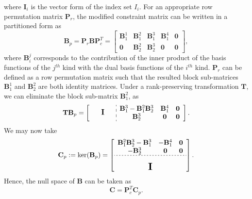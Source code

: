 \documentclass[preprint,12pt]{elsarticle}
\theoremstyle{remark}
\begin{document}
where $\mathbf{I}_i$ is the vector form of the index set  $I_i$. For an appropriate row permutation matrix $\mathbf{P}_r$, the modified constraint matrix can be written in a partitioned form as
\begin{equation}
    \mathbf{B}_p=\mathbf{P}_r\mathbf{B}\mathbf{P}_c^T=
    \begin{bmatrix}
        \mathbf{B}_1^1 & \mathbf{B}_1^2 & \mathbf{B}_1^3 & \mathbf{B}_1^4 & \mathbf{0} \\
        \mathbf{0} & \mathbf{B}_2^2 & \mathbf{B}_2^3 & \mathbf{0} & \mathbf{0}
    \end{bmatrix},
\end{equation}
where $\mathbf{B}_i^j$ corresponds to the contribution of the inner product of the basis functions of the $j^{th}$ kind with the dual basis functions of the $i^{th}$ kind. $\mathbf{P}_r$ can be defined as a row permutation matrix such that the resulted block sub-matrices $\mathbf{B}_1^1$ and $\mathbf{B}_2^2$ are both identity matrices. Under a rank-preserving transformation $\mathbf{T}$, we can eliminate the block sub-matrix $\mathbf{B}_1^2$, as
\begin{equation}
    \sbox0{$\begin{matrix}\mathbf{B}_1^3-\mathbf{B}_1^2\mathbf{B}_2^3 & \mathbf{B}_1^4 & \mathbf{0} \\ \mathbf{B}_2^3 & \mathbf{0} & \mathbf{0}\end{matrix}$}
    \mathbf{T}\mathbf{B}_p=\left[
        \begin{array}{c:c}
            \makebox[\wd0/3]{\large $\mathbf{I}$} & \usebox{0}\\
        \end{array}
        \right].\label{eq:simple_form}
\end{equation}
We may now take
\begin{equation}
    \mathbf{C}_p:=\ker(\mathbf{B}_p)=
  \left[\begin{array}{ccc}
    \mathbf{B}_1^2\mathbf{B}_2^3-\mathbf{B}_1^3 & -\mathbf{B}_1^4 & \mathbf{0} \\ 
    -\mathbf{B}_2^3 & \mathbf{0} & \mathbf{0} \\ \hdashline[2pt/2pt]
     \multicolumn{3}{c}{\multirow{3}{*}{\raisebox{0mm}{\scalebox{1.5}{$\mathbf{I}$}}}} \\
     & &
  \end{array}\right].
\end{equation}
Hence, the null space of $\mathbf{B}$ can be taken as
\begin{equation}
    \mathbf{C}=\mathbf{P}_c^T\mathbf{C}_p.
\end{equation}
\end{document}
